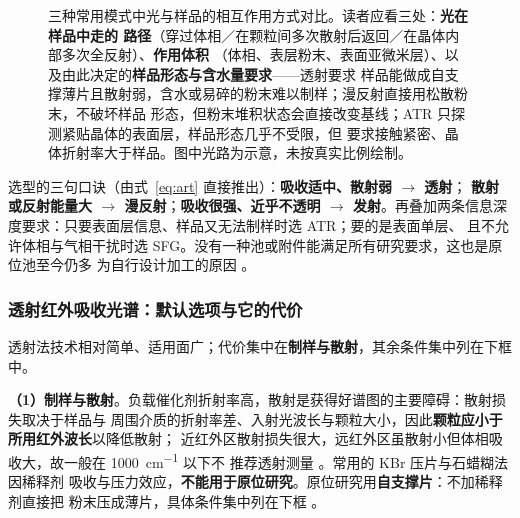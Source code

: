 \begin{figure}[tbp]
{}
\caption{三种常用模式中光与样品的相互作用方式对比。读者应看三处：\textbf{光在样品中走的
路径}（穿过体相／在颗粒间多次散射后返回／在晶体内部多次全反射）、\textbf{作用体积}
（体相、表层粉末、表面亚微米层）、以及由此决定的\textbf{样品形态与含水量要求}——透射要求
样品能做成自支撑薄片且散射弱，含水或易碎的粉末难以制样；漫反射直接用松散粉末，不破坏样品
形态，但粉末堆积状态会直接改变基线；ATR 只探测紧贴晶体的表面层，样品形态几乎不受限，但
要求接触紧密、晶体折射率大于样品。图中光路为示意，未按真实比例绘制。\schemamark
{}}
\label{fig:paths}
\end{figure}

\begin{keycond}
选型的三句口诀（由式~\eqref{eq:art} 直接推出）：\textbf{吸收适中、散射弱 $\rightarrow$ 透射}；
\textbf{散射或反射能量大 $\rightarrow$ 漫反射}；\textbf{吸收很强、近乎不透明 $\rightarrow$
发射}。再叠加两条信息深度要求：只要表面层信息、样品又无法制样时选 ATR；要的是表面单层、
且不允许体相与气相干扰时选 SFG。没有一种池或附件能满足所有研究要求，这也是原位池至今仍多
为自行设计加工的原因 。
\end{keycond}

\subsubsection{透射红外吸收光谱：默认选项与它的代价}

透射法技术相对简单、适用面广；代价集中在\textbf{制样与散射}，其余条件集中列在下框中。

\textbf{（1）制样与散射}。负载催化剂折射率高，散射是获得好谱图的主要障碍：散射损失取决于样品与
周围介质的折射率差、入射光波长与颗粒大小，因此\textbf{颗粒应小于所用红外波长}以降低散射；
近红外区散射损失很大，远红外区虽散射小但体相吸收大，故一般在 \qty{1000}{cm^{-1}} 以下不
推荐透射测量 。常用的 KBr 压片与石蜡糊法因稀释剂
吸收与压力效应，\textbf{不能用于原位研究}。原位研究用\textbf{自支撑片}：不加稀释剂直接把
粉末压成薄片，具体条件集中列在下框
。

